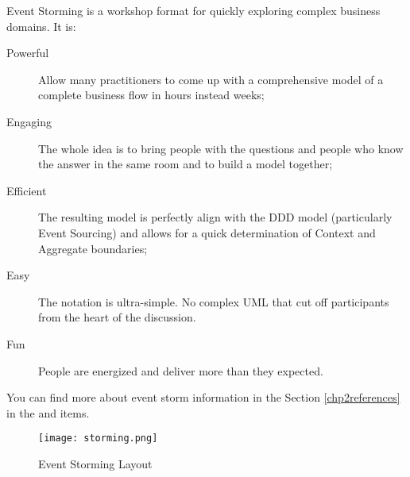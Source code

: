 Event Storming is a workshop format for quickly exploring complex business domains. It is:
\begin{description}
    \item[Powerful] Allow many practitioners to come up with a comprehensive model of a complete business flow in hours instead weeks;
    \item[Engaging] The whole idea is to bring people with the questions and people who know the answer in the same room and to build a model together;
    \item[Efficient] The resulting model is perfectly align with the DDD model (particularly Event Sourcing) and allows for a quick determination of Context and Aggregate boundaries;
    \item[Easy] The notation is ultra-simple. No complex UML that cut off participants from the heart of the discussion.
    \item[Fun] People are energized and deliver more than they expected.
\end{description}

You can find more about event storm information in the Section \ref{chp2references} in the \cite{wiksto20} and \cite{albbra13} items.

\begin{figure}[ht]
\caption{Event Storming Layout}
\centering
\texttt{[image: storming.png]}
 \label{fig:storming}
\end{figure}

